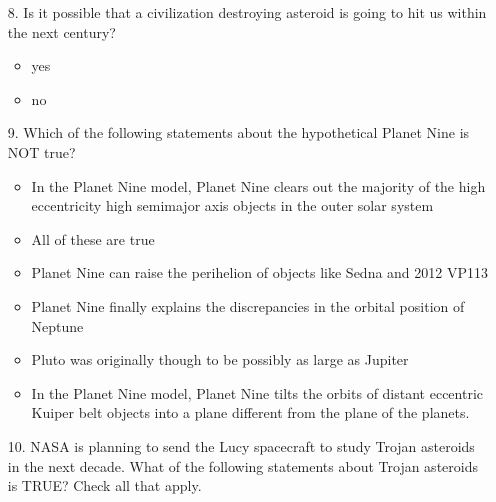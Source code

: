 \begin{enumerate}
\begin{multicols}{2}
\begin{itemize}[label={$\bullet$}]
       \item The presence of icy bodies among the Jupiter trojan
       \item The abundance of Kuiper belt objects in resonaces
       \item The low mass of Mars
       \item The higher than expected eccentricities of the giant planets
       \item The lateness of the Late Heavy Bomdardment
    \end{itemize}\end{multicols}
    \item[8.] Is it possible that a civilization destroying asteroid is going to hit us within the next century?
    \begin{multicols}{2} \begin{itemize}[label={$\bullet$}]
        \item yes
        \item no
     \end{itemize}\end{multicols}
    \item[9.] Which of the following statements about the hypothetical Planet Nine is NOT true?
    \begin{multicols}{2} \begin{itemize}[label={$\bullet$}]
        \item In the Planet Nine model, Planet Nine clears out the majority of the high eccentricity high semimajor axis objects in the outer solar system
        \item All of these are true
        \item Planet Nine can raise the perihelion of objects like Sedna and 2012 VP113
        \item Planet Nine finally explains the discrepancies in the orbital position of Neptune
        \item Pluto was originally though to be possibly as large as Jupiter
        \item In the Planet Nine model, Planet Nine tilts the orbits of distant eccentric Kuiper belt objects into a plane different from the plane of the planets.
    \end{itemize}\end{multicols}
    \item[10.] NASA is planning to send the Lucy spacecraft to study Trojan asteroids in the next decade. What of the following statements about Trojan asteroids is TRUE? Check all that apply. 

\end{enumerate}
